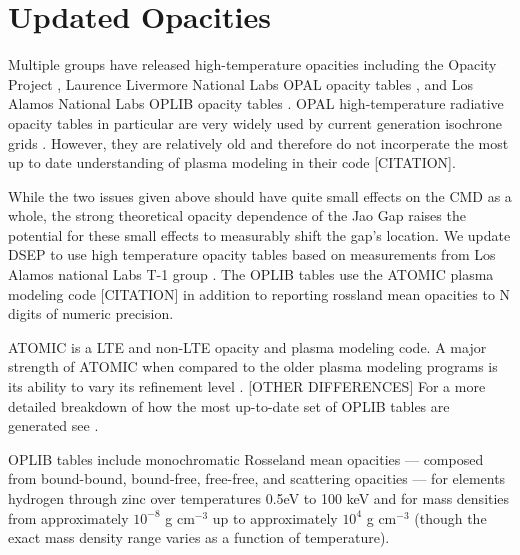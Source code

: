 \section{Updated Opacities}\label{sec:opac}
Multiple groups have released high-temperature opacities including the Opacity
Project \citep[OP][]{Seaton1994}, Laurence Livermore National Labs OPAL opacity
tables \citep{Iglesias1996}, and Los Alamos National Labs OPLIB opacity tables
\citep{Colgan2016}. OPAL high-temperature radiative opacity tables in
particular are very widely used by current generation isochrone grids
\citep[e.g. Dartmouth, MIST, \& StarEvol, ][]{Dotter2008,Choi2016,Amard2019}.
However, they are relatively old and therefore do not incorperate the most up to
date understanding of plasma modeling in their code {\color{red} [CITATION]}.

While the two issues given above should  have quite small effects on the CMD as
a whole, the strong theoretical opacity dependence of the Jao Gap raises the
potential for these small effects to measurably shift the gap's location. We
update DSEP to use high temperature opacity tables based on measurements from
Los Alamos national Labs T-1 group \citep[OPLIB,][]{Colgan2016}. The OPLIB
tables use the ATOMIC plasma modeling code {\color{red} [CITATION]} in addition
to reporting rossland mean opacities to {\color{red} N} digits of numeric
precision.

ATOMIC \citep{Magee2004} is a LTE and non-LTE opacity and plasma modeling code.
A major strength of ATOMIC when compared to the older plasma modeling programs
is its ability to vary its refinement level \citep{Fontes2016}.
{\color{red}[OTHER DIFFERENCES]} For a more detailed breakdown of how the most
up-to-date set of OPLIB tables are generated see \citep{Colgan2016}.

OPLIB tables include monochromatic Rosseland mean opacities --- composed from
bound-bound, bound-free, free-free, and scattering opacities --- for elements
hydrogen through zinc over temperatures 0.5eV to 100 keV and for mass densities
from approximately $10^{-8}$ g cm$^{-3}$ up to approximately $10^{4}$ g
cm$^{-3}$ (though the exact mass density range varies as a function of
temperature). 

